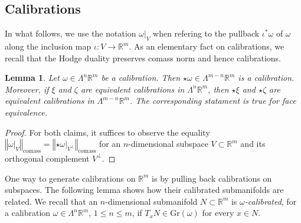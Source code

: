 \documentclass[a4paper,leqno,11pt]{amsart}
\numberwithin{equation}{section}
\newtheorem{lemma}[theorem]{Lemma}
\theoremstyle{remark}
\theoremstyle{remark}
\newcommand{\R}{\mathbb{R}}
\newcommand{\norm}[1]{ \left\Vert #1 \right\Vert }	%
\newcommand{\comass}{\mathrm{comass}}
\newcommand{\Gr}{\mathrm{Gr}}
\begin{document}
\subsection{Calibrations}

In what follows, we use the notation $\omega|_{V}$ when refering to the pullback $\iota^{*}\omega$ of $\omega$ along the inclusion map $\iota \colon V \rightarrow \R^m$. As an elementary fact on calibrations, we recall that the Hodge duality preserves comass norm and hence calibrations. 
%
\begin{lemma}
\label{lemma:calibration-duality}
Let $\omega \in \Lambda^n \R^m$ be a calibration. Then $\star \omega \in \Lambda^{m-n} \R^m$ is a calibration. Moreover, if $\xi$ and $\zeta$ are equivalent calibrations in $\Lambda^n \R^m$, then $\star \xi$ and $\star \zeta$ are equivalent calibrations in $\Lambda^{m-n} \R^m$. The corresponding statament is true for face equivalence.
\end{lemma}

\begin{proof}
For both claims, it suffices to observe the equality $\norm{\omega|_V}_\comass = \norm{\star \omega|_{V^\bot}}_\comass$ for an $n$-dimensional subspace $V\subset \R^m$ and its orthogonal complement $V^\bot$.  
\end{proof}

One way to generate calibrations on $\mathbb{R}^m$ is by pulling back calibrations on subspaces. The following lemma shows how their calibrated submanifolds are related. We recall that an $n$-dimensional submanifold $N \subset \R^m$ is \emph{$\omega$-calibrated}, for a calibration $\omega \in \Lambda^n \R^m$, $1 \leq n \leq m$, if $T_x N \in \Gr(\omega)$ for every $x \in N$.
\end{document}
